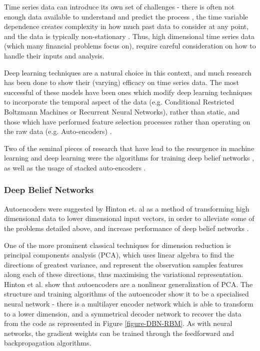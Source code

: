\documentclass[a4paper,latin]{paper}
\begin{document}
Time series data can introduce its own set of challenges - there is often not enough data available to understand 
and predict the process \cite{Fama}, the time variable dependence creates complexity in how much past 
data to consider at any point, and the data is typically non-stationary \cite{Langkvist}. Thus, high dimensional time 
series data (which many financial problems focus on), require careful consideration on how to handle their inputs 
and analysis.
\hfill \break 

Deep learning techniques are a natural choice in this context, and much research has been done to show their 
(varying) efficacy on time series data. The most successful of these models have been ones which modify deep 
learning techniques to incorporate the temporal aspect of the data (e.g. Conditional Restricted Boltzmann 
Machines or Recurrent Neural Networks), rather than static, and those which have performed feature selection
 processes rather than operating on the raw data (e.g. Auto-encoders)  \cite{Langkvist}. 
 \hfill \break 
 
 
Two of the seminal pieces of research that have lead to the resurgence in machine learning and deep learning 
were the algorithms for training deep belief networks \cite{Hinton1}, as well as the usage of stacked auto-encoders
\cite{Ranzato1, Bengio1}. 

 
\subsubsection{Deep Belief Networks}\label{DBN}
 
 Autoencoders were suggested by Hinton et. al as a method of transforming high dimensional 
 data to lower dimensional input vectors, in order to alleviate some of the problems detailed above, and increase 
 performance of deep belief networks \cite{Hinton2}.
\hfill \break 

One of the more prominent classical techniques for dimension reduction is principal components analysis (PCA), 
which uses linear algebra to find the directions of greatest variance, and represent the observation samples 
features along each of these directions, thus maximising the variational representation. Hinton et al. show that 
autoencoders are a nonlinear generalization of PCA. The structure and training algorithms of the autoencoder 
show it to be a specialised neural network - there is a multilayer encoder network which is able to transform to a 
lower dimension, and a symmetrical decoder network to recover the data from the code as represented in Figure \ref{figure-DBN-RBM}. As with 
neural networks, the gradient weights can be trained through the feedforward and backpropagation algorithms.  
\hfill \break 
\end{document}
